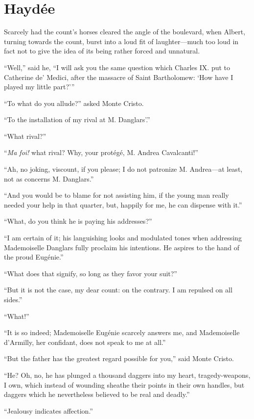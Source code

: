 \chapter{Haydée}

Scarcely had the count’s horses cleared the angle of the boulevard,
when Albert, turning towards the count, burst into a loud fit of
laughter—much too loud in fact not to give the idea of its being rather
forced and unnatural.

“Well,” said he, “I will ask you the same question which Charles IX.
put to Catherine de’ Medici, after the massacre of Saint Bartholomew:
‘How have I played my little part?’”

“To what do you allude?” asked Monte Cristo.

“To the installation of my rival at M. Danglars’.”

“What rival?”

“\textit{Ma foi!} what rival? Why, your protégé, M. Andrea Cavalcanti!”

“Ah, no joking, viscount, if you please; I do not patronize M.
Andrea—at least, not as concerns M. Danglars.”

“And you would be to blame for not assisting him, if the young man
really needed your help in that quarter, but, happily for me, he can
dispense with it.”

“What, do you think he is paying his addresses?”

“I am certain of it; his languishing looks and modulated tones when
addressing Mademoiselle Danglars fully proclaim his intentions. He
aspires to the hand of the proud Eugénie.”

“What does that signify, so long as they favor your suit?”

“But it is not the case, my dear count: on the contrary. I am repulsed
on all sides.”

“What!”

“It is so indeed; Mademoiselle Eugénie scarcely answers me, and
Mademoiselle d’Armilly, her confidant, does not speak to me at all.”

“But the father has the greatest regard possible for you,” said Monte
Cristo.

“He? Oh, no, he has plunged a thousand daggers into my heart,
tragedy-weapons, I own, which instead of wounding sheathe their points
in their own handles, but daggers which he nevertheless believed to be
real and deadly.”

“Jealousy indicates affection.”

